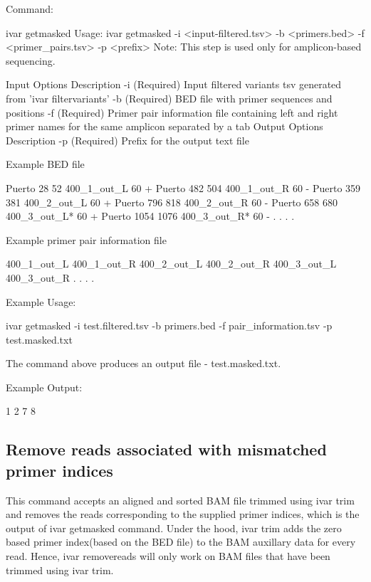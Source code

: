 Command\+: 
\begin{DoxyCode}
ivar getmasked
Usage: ivar getmasked -i <input-filtered.tsv> -b <primers.bed> -f <primer\_pairs.tsv> -p <prefix>
Note: This step is used only for amplicon-based sequencing.

Input Options    Description
           -i    (Required) Input filtered variants tsv generated from 'ivar filtervariants'
           -b    (Required) BED file with primer sequences and positions
           -f    (Required) Primer pair information file containing left and right primer names for the
       same amplicon separated by a tab
Output Options   Description
           -p    (Required) Prefix for the output text file
\end{DoxyCode}


Example B\+ED file


\begin{DoxyCode}
Puerto  28  52  400\_1\_out\_L 60  +
Puerto  482 504 400\_1\_out\_R 60  -
Puerto  359 381 400\_2\_out\_L 60  +
Puerto  796 818 400\_2\_out\_R 60  -
Puerto  658 680 400\_3\_out\_L*    60  +
Puerto  1054    1076    400\_3\_out\_R*    60  -
.
.
.
.
\end{DoxyCode}


Example primer pair information file 
\begin{DoxyCode}
400\_1\_out\_L    400\_1\_out\_R
400\_2\_out\_L    400\_2\_out\_R
400\_3\_out\_L    400\_3\_out\_R
.
.
.
.
\end{DoxyCode}


Example Usage\+: 
\begin{DoxyCode}
ivar getmasked -i test.filtered.tsv -b primers.bed -f pair\_information.tsv -p test.masked.txt
\end{DoxyCode}


The command above produces an output file -\/ test.\+masked.\+txt.

Example Output\+:


\begin{DoxyCode}
1 2 7 8
\end{DoxyCode}
\hypertarget{manualpage_autotoc_md21}{}\subsection{Remove reads associated with mismatched primer indices}\label{manualpage_autotoc_md21}
This command accepts an aligned and sorted B\+AM file trimmed using {\ttfamily ivar trim} and removes the reads corresponding to the supplied primer indices, which is the output of {\ttfamily ivar getmasked} command. Under the hood, {\ttfamily ivar trim} adds the zero based primer index(based on the B\+E\+D file) to the B\+AM auxillary data for every read. Hence, ivar removereads will only work on B\+AM files that have been trimmed using {\ttfamily ivar trim}.

